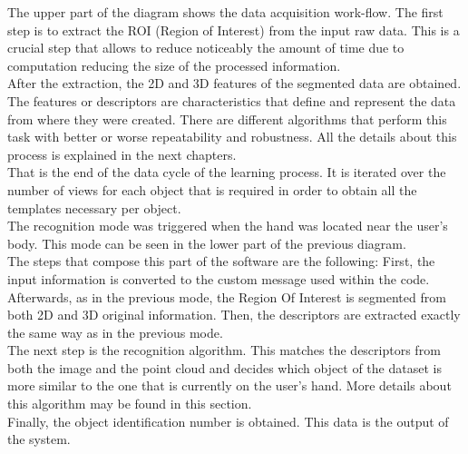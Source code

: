The upper part of the diagram shows the data acquisition work-flow. The first step is to extract the ROI (Region of Interest) from the input raw data. This is a crucial step that allows to reduce noticeably the amount of time due to computation reducing the size of the processed information. 
\\

After the extraction, the 2D and 3D features of the segmented data are obtained. The features or descriptors are characteristics that define and represent the data from where they were created. There are different algorithms that perform this task with better or worse repeatability and robustness. All the details about this process is explained in the next chapters. 
\\

That is the end of the data cycle of the learning process. It is iterated over the number of views for each object that is required in order to obtain all the templates necessary per object. 
\\

The recognition mode was triggered when the hand was located near the user's body. This mode can be seen in the lower part of the previous diagram. 
\\

The steps that compose this part of the software are the following: 
First, the input information is converted to the custom message used within the code. Afterwards, as in the previous mode, the Region Of Interest is segmented from both 2D and 3D original information. Then, the descriptors are extracted exactly the same way as in the previous mode. 
\\

The next step is the recognition algorithm. This matches the descriptors from both the image and the point cloud and decides which object of the dataset is more similar to the one that is currently on the user's hand. More details about this algorithm may be found in this section. 
\\

Finally, the object identification number is obtained. This data is the output of the system. 
